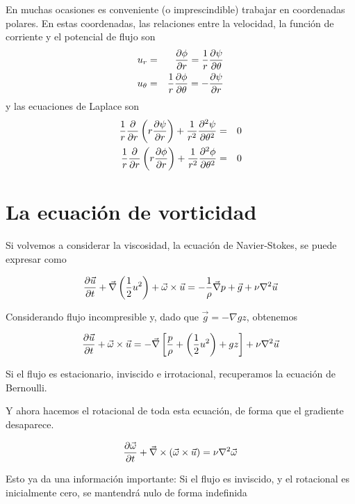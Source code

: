 	
	En muchas ocasiones es conveniente (o imprescindible) trabajar en
	coordenadas polares. En estas coordenadas, las relaciones entre la
	velocidad, la función de corriente y el potencial de flujo son 
	\begin{eqnarray}
		u_{r} & = & \frac{\partial \phi}{\partial r}=\frac{1}{r}\frac{\partial \psi}{\partial \theta}\\
		u_{\theta} & = & \frac{1}{r}\frac{\partial \phi}{\partial \theta}=-\frac{\partial \psi}{\partial r}
	\end{eqnarray}
	y las ecuaciones de Laplace son 
	\begin{eqnarray}
		\frac{1}{r}\frac{\partial }{\partial r}\left(r\frac{\partial \psi}{\partial r}\right)+\frac{1}{r^{2}}\frac{\partial^2 \psi}{\partial \theta^2} & = & 0\\
		\frac{1}{r}\frac{\partial }{\partial r}\left(r\frac{\partial \phi}{\partial r}\right)+\frac{1}{r^{2}}\frac{\partial^2 \phi}{\partial \theta^2} & = & 0
	\end{eqnarray}
	


\section{La ecuación de vorticidad}

	
	Si volvemos a considerar la viscosidad, la ecuación de Navier-Stokes,
	se puede expresar como 
	
\begin{equation}
		\frac{\partial \vec{u}}{\partial t}+\vec{\nabla}\left(\frac{1}{2}u^{2}\right)+\vec{\omega}\times\vec{u}=-\frac{1}{\rho}\vec{\nabla}p+\vec{g}+\nu\nabla^{2}\vec{u}
\end{equation}
	
	Considerando flujo incompresible y, dado que $\vec{g}=-\nabla gz$,
	obtenemos 
	
\begin{equation}
		\frac{\partial \vec{u}}{\partial t}+\vec{\omega}\times\vec{u}=-\vec{\nabla}\left[\frac{p}{\rho}+\left(\frac{1}{2}u^{2}\right)+gz\right]+\nu\nabla^{2}\vec{u}
\end{equation}
	
	Si el flujo es estacionario, inviscido e irrotacional,
		recuperamos la ecuación de Bernoulli.

	
	Y ahora hacemos el rotacional de toda esta ecuación, de forma que
	el gradiente desaparece. 
	
\begin{equation}
		\frac{\partial \vec{\omega}}{\partial t}+\vec \nabla \times\left(\vec{\omega}\times\vec{u}\right)=\nu\nabla^{2}\vec{\omega}
\end{equation}
	
	Esto ya da una información importante: Si el flujo es inviscido,
	y el rotacional es inicialmente cero, se mantendrá nulo de forma indefinida
	
